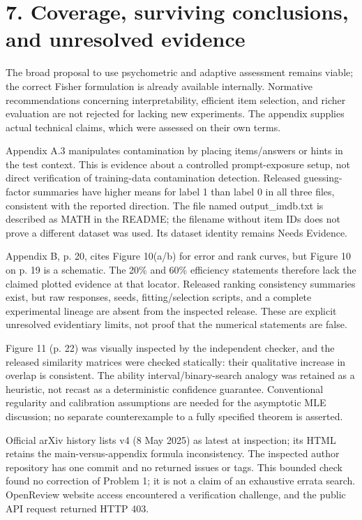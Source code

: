 \documentclass[10pt]{article}
\begin{document}
\section*{7. Coverage, surviving conclusions, and unresolved evidence}
The broad proposal to use psychometric and adaptive assessment remains viable; the correct Fisher formulation is already available internally. Normative recommendations concerning interpretability, efficient item selection, and richer evaluation are not rejected for lacking new experiments. The appendix supplies actual technical claims, which were assessed on their own terms.\par
Appendix A.3 manipulates contamination by placing items/answers or hints in the test context. This is evidence about a controlled prompt-exposure setup, not direct verification of training-data contamination detection. Released guessing-factor summaries have higher means for label 1 than label 0 in all three files, consistent with the reported direction. The file named output\_imdb.txt is described as MATH in the README; the filename without item IDs does not prove a different dataset was used. Its dataset identity remains Needs Evidence.\par
Appendix B, p. 20, cites Figure 10(a/b) for error and rank curves, but Figure 10 on p. 19 is a schematic. The 20\% and 60\% efficiency statements therefore lack the claimed plotted evidence at that locator. Released ranking consistency summaries exist, but raw responses, seeds, fitting/selection scripts, and a complete experimental lineage are absent from the inspected release. These are explicit unresolved evidentiary limits, not proof that the numerical statements are false.\par
Figure 11 (p. 22) was visually inspected by the independent checker, and the released similarity matrices were checked statically: their qualitative increase in overlap is consistent. The ability interval/binary-search analogy was retained as a heuristic, not recast as a deterministic confidence guarantee. Conventional regularity and calibration assumptions are needed for the asymptotic MLE discussion; no separate counterexample to a fully specified theorem is asserted.\par
Official arXiv history lists v4 (8 May 2025) as latest at inspection; its HTML retains the main-versus-appendix formula inconsistency. The inspected author repository has one commit and no returned issues or tags. This bounded check found no correction of Problem 1; it is not a claim of an exhaustive errata search. OpenReview website access encountered a verification challenge, and the public API request returned HTTP 403.\par
\end{document}
